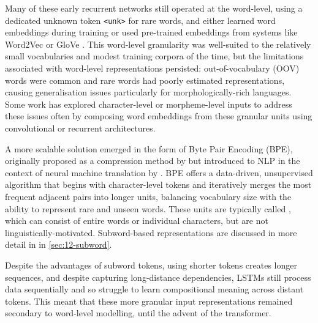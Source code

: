 Many of these early recurrent networks still operated at the word-level, using a dedicated unknown token \texttt{<unk>} for rare words, and either learned word embeddings during training or used pre-trained embeddings from systems like Word2Vec or GloVe \citep{pennington2014glove}. This word-level granularity was well-suited to the relatively small vocabularies and modest training corpora of the time, but the limitations associated with word-level representations persisted: out-of-vocabulary (OOV) words were common and rare words had poorly estimated representations, causing generalisation issues particularly for morphologically-rich languages. Some work has explored character-level or morpheme-level inputs to address these issues \citep{botha2014compositional, jozefowicz2016exploringlimitslanguagemodeling, kim2016character, vania2017morphology, gerz2018, ustun-etal-2018-characters} often by composing word embeddings from these granular units using convolutional or recurrent architectures.

A more scalable solution emerged in the form of Byte Pair Encoding (BPE), originally proposed as a compression method by \citet{gage1994new} but introduced to NLP in the context of neural machine translation by \citet{sennrich-etal-2016-bpe}. BPE offers a data-driven, unsupervised algorithm that begins with character-level tokens and iteratively merges the most frequent adjacent pairs into longer units, balancing vocabulary size with the ability to represent rare and unseen words. These units are typically called , which can consist of entire words or individual characters, but are not linguistically-motivated. Subword-based representations are discussed in more detail in in \cref{sec:12-subword}.


Despite the advantages of subword tokens, using shorter tokens creates longer sequences, and despite capturing long-distance dependencies, LSTMs still process data sequentially and so struggle to learn compositional meaning across distant tokens. This meant that these more granular input representations remained secondary to word-level modelling, until the advent of the transformer.

